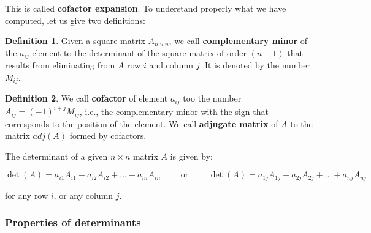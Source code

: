 \documentclass[a4paper,11pt]{article}
\theoremstyle{definition}
\newtheorem{definition}{Definition}
\theoremstyle{plain}
\begin{document}
This is called \textbf{cofactor expansion}. To understand properly what
we have computed, let us give two definitions:

\begin{definition}
Given a square matrix \(A_{n\times n}\), we call \textbf{complementary minor} of the \(a_{ij}\) element to the
determinant of the square matrix of order \((n-1)\) that results from
eliminating from \(A\) row \(i\) and column \(j\). It is denoted by the
number \(M_{ij}\).
\end{definition}

\begin{definition}
We call \textbf{cofactor} of element \(a_{ij}\) too
the number \(A_{ij} = (-1)^{i+j} M_{ij}\), i.e., the complementary minor
with the sign that corresponds to the position of the element. We call
\textbf{adjugate matrix} of \(A\) to the matrix \(adj(A)\) formed by
cofactors.
\end{definition}

The determinant of a given \(n\times n\) matrix \(A\) is given by:

\[
\det(A) = a_{i1}A_{i1} + a_{i2}A_{i2} + \ldots + a_{in}A_{in} \qquad \text{ or } \qquad \det(A) = a_{1j}A_{1j} + a_{2j} A_{2j} + \ldots + a_{nj}A_{nj}
\]

for any row \(i\), or any column \(j\).

\subsubsection{Properties of
determinants}\label{properties-of-determinants}
\end{document}
